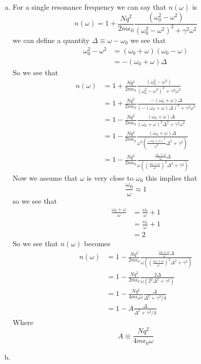 \documentclass[11pt]{article}
\numberwithin{equation}{section}
\begin{document}
\begin{enumerate}[(a)]
\item
For a single resonance frequency we can say that $n(\omega)$ is
$$n(\omega) = 1+\frac{Nq^2}{2m\epsilon_0}\frac{(\omega_0^2-\omega^2)}{(\omega_0^2-\omega^2)^2+\gamma^2\omega^2}$$
we can define a quantity $\Delta\equiv\omega-\omega_0$ we see that
\begin{align*}
\omega_0^2-\omega^2 &= (\omega_0+\omega)(\omega_0-\omega)\\
&= -(\omega_0+\omega)\Delta
\end{align*}
So we see that 
\begin{align*}
n(\omega) &= 1+\frac{Nq^2}{2m\epsilon_0}\frac{(\omega_0^2-\omega^2)}{(\omega_0^2-\omega^2)^2+\gamma^2\omega^2}\\
&= 1+\frac{Nq^2}{2m\epsilon_0}\frac{-(\omega_0+\omega)\Delta}{(-(\omega_0+\omega)\Delta)^2+\gamma^2\omega^2}\\
&= 1-\frac{Nq^2}{2m\epsilon_0}\frac{(\omega_0+\omega)\Delta}{(\omega_0+\omega)^2\Delta^2+\gamma^2\omega^2}\\
&= 1-\frac{Nq^2}{2m\epsilon_0}\frac{(\omega_0+\omega)\Delta}{\omega^2\left(\frac{(\omega_0+\omega)^2}{\omega^2}\Delta^2+\gamma^2\right)}\\
&= 1-\frac{Nq^2}{2m\epsilon_0}\frac{\frac{\omega_0+\omega}{\omega}\Delta}{\omega\left(\left(\frac{\omega_0+\omega}{\omega}\right)^2\Delta^2+\gamma^2\right)}
\end{align*}
Now we assume that $\omega$ is very close to $\omega_0$ this implies that
$$\frac{\omega_0}{\omega} \approx 1$$
so we see that
\begin{align*}
\frac{\omega_0+\omega}{\omega} &= \frac{\omega_0}{\omega}+1\\
&= \frac{\omega_0}{\omega}+1\\
&= 2
\end{align*}
So we see that $n(\omega)$ becomes 
\begin{align*}
n(\omega) &= 1-\frac{Nq^2}{2m\epsilon_0}\frac{\frac{\omega_0+\omega}{\omega}\Delta}{\omega\left(\left(\frac{\omega_0+\omega}{\omega}\right)^2\Delta^2+\gamma^2\right)}\\
&= 1-\frac{Nq^2}{2m\epsilon_0}\frac{2\Delta}{\omega\left(2^2\Delta^2+\gamma^2\right)}\\
&= 1-\frac{Nq^2}{4m\epsilon_0\omega}\frac{\Delta}{\Delta^2+\gamma^2/4}\\
&= 1-A\frac{\Delta}{\Delta^2+\gamma^2/4}
\end{align*}
Where
$$A\equiv\frac{Nq^2}{4m\epsilon_0\omega}$$

\item
\end{enumerate}
\end{document}
